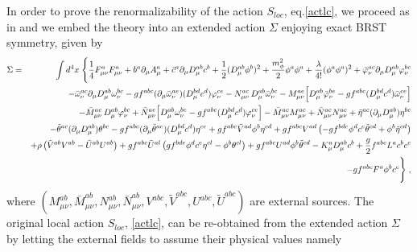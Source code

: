 \begin{appendix}
In order to prove the renormalizability of the action $S_{ loc}$, eq.\eqref{actlc}, we proceed as in   \cite{Zwanziger:1988jt,Zwanziger:1989mf,Zwanziger:1992qr,Dudal:2007cw,Dudal:2008sp,Dudal:2011gd} and we embed the theory into an extended action $\Sigma$ enjoying exact BRST symmetry, given by
%
\begin{eqnarray}
\label{fullact}
\Sigma &=& \int d^4x\; \Biggl\{
\frac{1}{4}F^a_{\mu\nu} F^a_{\mu\nu}
+ b^{a}\partial_{\mu}A^{a}_{\mu}
+ \bar{c}^{a}\partial_{\mu}D^{ab}_{\mu}c^{b}
+ \frac{1}{2}(D^{ab}_{\mu}\phi^{b})^{2} + \frac{m^2_{\phi}}{2} \phi^a \phi^a
+ \frac{\lambda}{4!}(\phi^{a}\phi^{a})^{2}
+ \bar{\varphi}^{ac}_{\nu}\partial_{\mu}D^{ab}_{\mu}\varphi^{bc}_{\nu}
\nonumber \\
&&
- \bar{\omega}^{ac}_{\nu}\partial_{\mu}D^{ab}_{\mu}\omega^{bc}_{\nu}
- gf^{abc}(\partial_{\mu}\bar{\omega}^{ae}_{\nu})(D^{bd}_{\mu}c^{d})\varphi^{ce}_\nu
-{N}^{ac}_{\mu\nu}\,D^{ab}_{\mu}\bar{\omega}^{bc}_{\nu}
-{M}^{ae}_{\mu\nu}\Bigl[D^{ab}_{\mu}\bar{\varphi}^{be}_{\nu}
-gf^{abc}(D^{bd}_{\mu}c^{d})\bar{\omega}^{ce}_{\nu}
\Bigr]
\nonumber \\
&&
- \bar{M}^{ac}_{\mu\nu}\,D^{ab}_{\mu}\varphi^{bc}_{\nu}
+ \bar{N}^{ae}_{\mu\nu}\Bigl[D^{ab}_{\mu}\omega^{be}_{\nu}
- gf^{abc}(D^{bd}_{\mu}c^{d})\varphi^{ce}_{\nu}
\Bigr]
- \bar{M}^{ac}_{\mu\nu}{M}^{ac}_{\mu\nu}
+ \bar{N}^{ac}_{\mu\nu}{N}^{ac}_{\mu\nu}
+ \tilde{\eta}^{ac}(\partial_{\mu}D_{\mu}^{ab})\eta^{bc}
\nonumber \\
&&
- \tilde{\theta}^{ac}(\partial_{\mu}D_{\mu}^{ab})\theta^{bc}
- gf^{abc}(\partial_{\mu}\tilde{\theta}^{ae})(D^{bd}_{\mu}c^{d})\eta^{ce}
+ gf^{abc}\tilde{V}^{ad}\phi^{b}\eta^{cd}
+ gf^{abc}V^{ad}\left( 
- gf^{bde}\phi^{d}c^{e}\tilde{\theta}^{cd}
+ \phi^{b}\tilde{\eta}^{cd}
\right)
\nonumber \\
&&
+ \rho\left(\tilde{V}^{ab}V^{ab} - \tilde{U}^{ab}U^{ab}\right)
+ gf^{abc}\tilde{U}^{al}\left( gf^{bde}\phi^{d}c^{e}\eta^{cl}
- \phi^{b}\theta^{cl}\right)
+ gf^{abc}U^{ad}\phi^{b}\tilde{\theta}^{cd}
- K^{a}_{\mu}D^{ab}_{\mu}c^{b}
+ \frac{g}{2}f^{abc} L^{a}c^{b}c^{c}
\nonumber \\
&&
- gf^{abc} F^{a}\phi^{b}c^{c}
\Biggr\}\;,
\end{eqnarray}
%
where $\left( M^{ab}_{\mu\nu}, \bar{M}^{ab}_{\mu\nu}, N^{ab}_{\mu\nu}, \bar{N}^{ab}_{\mu\nu}, V^{abc}, \tilde{V}^{abc}, U^{abc}, \tilde{U}^{abc} \right)$ are external sources. 
%
The original local action $S_{ loc}$, \eqref{actlc}, can be re-obtained from the extended action $\Sigma$  by letting the external fields to assume their  physical values namely

\end{appendix}
